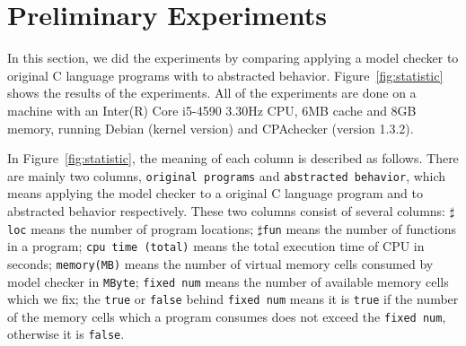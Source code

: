 \section{Preliminary Experiments}
\label{sec:experiment}
In this section, we did the experiments by comparing applying a model
checker to original C language programs with to abstracted
behavior. Figure~\ref{fig:statistic} shows the results of the
experiments. All of the experiments are done on a machine with an
Inter(R) Core i5-4590 3.30Hz CPU, 6MB cache and 8GB memory, running
Debian (kernel version) and CPAchecker (version 1.3.2).

In Figure~\ref{fig:statistic}, the meaning of each column is described
as follows. There are mainly two columns, \texttt{original programs}
and \texttt{abstracted behavior}, which means applying the model
checker to a original C language program and to abstracted behavior
respectively. These two columns consist of several columns:
$\sharp$\texttt{loc} means the number of program locations;
$\sharp$\texttt{fun} means the number of functions in a program;
\texttt{cpu time (total)} means the total execution time of CPU in
seconds; \texttt{memory(MB)} means the number of virtual memory cells
consumed by model checker in \texttt{MByte}; \texttt{fixed num} means
the number of available memory cells which we fix; the \texttt{true}
or \texttt{false} behind \texttt{fixed num} means it is \texttt{true}
if the number of the memory cells which a program consumes does not
exceed the \texttt{fixed num}, otherwise it is \texttt{false}.

